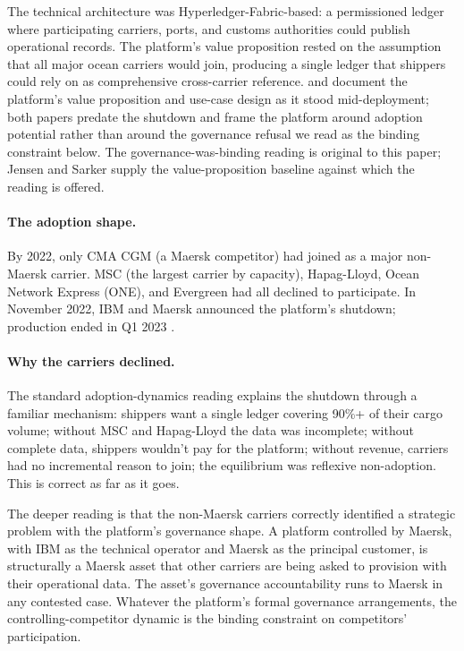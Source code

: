 \documentclass[11pt,a4paper]{article}
\theoremstyle{definition}
\theoremstyle{remark}
\begin{document}
The technical architecture was Hyperledger-Fabric-based: a
permissioned ledger where participating carriers, ports, and
customs authorities could publish operational records. The
platform's value proposition rested on the assumption that all
major ocean carriers would join, producing a single ledger that
shippers could rely on as comprehensive cross-carrier reference.
\citet{jensen_etal_2019} and \citet{sarker_etal_2021} document
the platform's value proposition and use-case design as it stood
mid-deployment; both papers predate the shutdown and frame the
platform around adoption potential rather than around the
governance refusal we read as the binding constraint below.
The governance-was-binding reading is original to this paper;
Jensen and Sarker supply the value-proposition baseline against
which the reading is offered.

\paragraph{The adoption shape.}
By 2022, only CMA CGM (a Maersk competitor) had joined as a major
non-Maersk carrier. MSC (the largest carrier by capacity),
Hapag-Lloyd, Ocean Network Express (ONE), and Evergreen had all
declined to participate. In November 2022, IBM and Maersk
announced the platform's shutdown; production ended in Q1 2023
\citep{lloyd_loadstar_2022}.

\paragraph{Why the carriers declined.}
The standard adoption-dynamics reading explains the shutdown
through a familiar mechanism: shippers want a single ledger
covering 90\%+ of their cargo volume; without MSC and Hapag-Lloyd
the data was incomplete; without complete data, shippers wouldn't
pay for the platform; without revenue, carriers had no
incremental reason to join; the equilibrium was reflexive
non-adoption. This is correct as far as it goes.

The deeper reading is that the non-Maersk carriers correctly
identified a strategic problem with the platform's governance
shape. A platform controlled by Maersk, with IBM as the technical
operator and Maersk as the principal customer, is structurally a
Maersk asset that other carriers are being asked to provision
with their operational data. The asset's governance accountability
runs to Maersk in any contested case. Whatever the platform's
formal governance arrangements, the controlling-competitor
dynamic is the binding constraint on competitors' participation.
\end{document}
